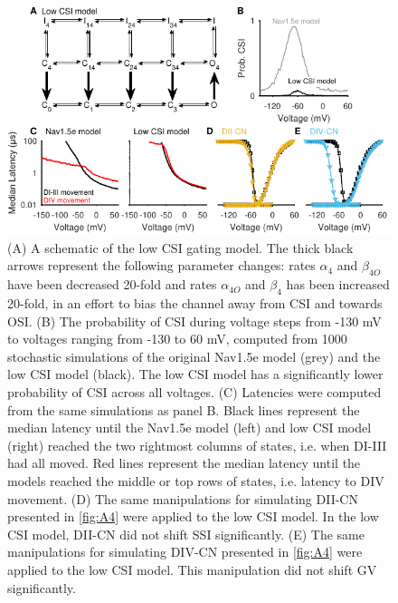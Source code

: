 \begin{figure}[t]
    \centering
    \includegraphics[width=115mm]{Figures/AppendixA/figure07.pdf}
    \caption{
    (A) A schematic of the low CSI gating model. The thick black arrows represent the following parameter changes: rates $\alpha_4$ and $\beta_{4O}$ have been decreased 20-fold and rates $\alpha_{4O}$ and $\beta_4$ has been increased 20-fold, in an effort to bias the channel away from CSI and towards OSI.
    (B) The probability of CSI during voltage steps from -130 mV to voltages ranging from -130 to 60 mV, computed from 1000 stochastic simulations of the original Nav1.5e model (grey) and the low CSI model (black). The low CSI model has a significantly lower probability of CSI across all voltages.
    (C) Latencies were computed from the same simulations as panel B. Black lines represent the median latency until the Nav1.5e model (left) and low CSI model (right) reached the two rightmost columns of states, i.e. when DI-III had all moved. Red lines represent the median latency until the models reached the middle or top rows of states, i.e. latency to DIV movement.
    (D) The same manipulations for simulating DII-CN presented in \autoref{fig:A4} were applied to the low CSI model. In the low CSI model, DII-CN did not shift SSI significantly.
    (E) The same manipulations for simulating DIV-CN presented in \autoref{fig:A4} were applied to the low CSI model. This manipulation did not shift GV significantly.}
    \label{fig:A7}
\end{figure}


